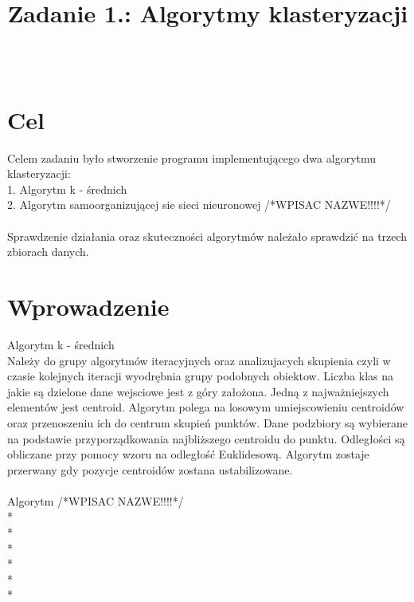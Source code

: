 \documentclass{classrep}
\author{%
  \studentinfo[216806@edu.p.lodz.pl]{Kamil Kowalewski}{216806}\\
  \studentinfo[216920@edu.p.lodz.pl]{Tomasz Witczak}{216920}%
}
\title{Zadanie 1.: Algorytmy klasteryzacji}
\begin{document}
\maketitle
\thispagestyle{fancyplain}

\section{Cel}
{Celem zadaniu było stworzenie programu implementującego dwa algorytmu klasteryzacji:\\
1. Algorytm k - średnich\\
2. Algorytm samoorganizującej sie sieci nieuronowej /*WPISAC NAZWE!!!!*/\\\\
Sprawdzenie działania oraz skuteczności algorytmów należało sprawdzić na trzech zbiorach danych.
}

\section{Wprowadzenie}
{Algorytm k - średnich\\
Należy do grupy algorytmów iteracyjnych oraz analizujacych skupienia czyli w czasie kolejnych iteracji wyodrębnia grupy podobnych obiektow. Liczba klas na jakie są dzielone dane wejsciowe jest z góry założona. Jedną z najważniejszych elementów jest centroid. Algorytm polega na losowym umiejscowieniu centroidów oraz przenoszeniu ich do centrum skupień punktów. Dane podzbiory są wybierane na podstawie przyporządkowania najbliższego centroidu do punktu. Odległości są obliczane przy pomocy wzoru na odległość Euklidesową. Algorytm zostaje przerwany gdy pozycje centroidów zostana ustabilizowane.\\\\

Algorytm /*WPISAC NAZWE!!!!*/\\
*\\
*\\
*\\
*\\
*\\
*\\

}
\end{document}
